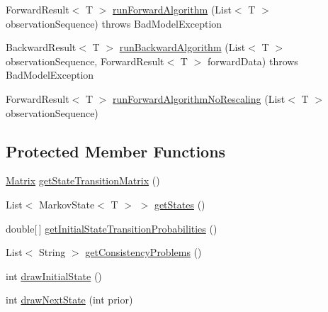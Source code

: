 \begin{DoxyCompactItemize}
Forward\+Result$<$ T $>$ \hyperlink{classbroad_1_1core_1_1hmm_1_1_markov_model_3_01_t_01_4_ab174b2df4c4b877bc4f4ec512db2d785}{run\+Forward\+Algorithm} (List$<$ T $>$ observation\+Sequence)  throws Bad\+Model\+Exception 
\item 
Backward\+Result$<$ T $>$ \hyperlink{classbroad_1_1core_1_1hmm_1_1_markov_model_3_01_t_01_4_a247765235a346e44aefaa487200a257d}{run\+Backward\+Algorithm} (List$<$ T $>$ observation\+Sequence, Forward\+Result$<$ T $>$ forward\+Data)  throws Bad\+Model\+Exception 
\item 
Forward\+Result$<$ T $>$ \hyperlink{classbroad_1_1core_1_1hmm_1_1_markov_model_3_01_t_01_4_a3645430154354933772229a18a32a042}{run\+Forward\+Algorithm\+No\+Rescaling} (List$<$ T $>$ observation\+Sequence)
\end{DoxyCompactItemize}
\subsection*{Protected Member Functions}
\begin{DoxyCompactItemize}
\item 
\hyperlink{class_jama_1_1_matrix}{Matrix} \hyperlink{classbroad_1_1core_1_1hmm_1_1_markov_model_3_01_t_01_4_a955cdf8737110eaf811de2a511bc4f30}{get\+State\+Transition\+Matrix} ()
\item 
List$<$ Markov\+State$<$ T $>$ $>$ \hyperlink{classbroad_1_1core_1_1hmm_1_1_markov_model_3_01_t_01_4_a8308c5b89e679a387d92b5343a13af95}{get\+States} ()
\item 
double\mbox{[}$\,$\mbox{]} \hyperlink{classbroad_1_1core_1_1hmm_1_1_markov_model_3_01_t_01_4_abc493a6b5d103b9cf94675560e02328c}{get\+Initial\+State\+Transition\+Probabilities} ()
\item 
List$<$ String $>$ \hyperlink{classbroad_1_1core_1_1hmm_1_1_markov_model_3_01_t_01_4_a0f483ef7027735422579aa60a3f6c9d6}{get\+Consistency\+Problems} ()
\item 
int \hyperlink{classbroad_1_1core_1_1hmm_1_1_markov_model_3_01_t_01_4_ab7e6ca7e9c392983039f74f2e99c62d7}{draw\+Initial\+State} ()
\item 
int \hyperlink{classbroad_1_1core_1_1hmm_1_1_markov_model_3_01_t_01_4_a4bf5ca33f4132fcf67b0016c4a13c35d}{draw\+Next\+State} (int prior)
\end{DoxyCompactItemize}



